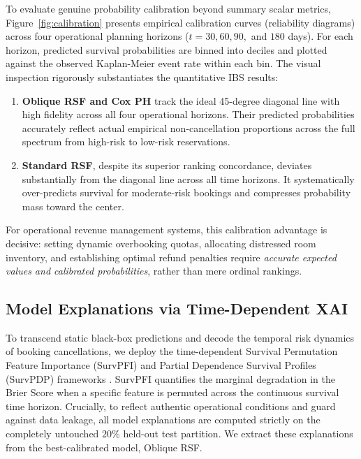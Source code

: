 \documentclass[pdflatex,iicol,sn-mathphys-ay]{sn-jnl}
\theoremstyle{thmstyleone}%
\theoremstyle{thmstyletwo}%
\theoremstyle{thmstylethree}%
\begin{document}
To evaluate genuine probability calibration beyond summary scalar metrics, Figure~\ref{fig:calibration} presents empirical calibration curves (reliability diagrams) across four operational planning horizons ($t = 30, 60, 90,$ and $180$ days). For each horizon, predicted survival probabilities are binned into deciles and plotted against the observed Kaplan-Meier event rate within each bin. The visual inspection rigorously substantiates the quantitative IBS results:
\begin{enumerate}
    \item \textbf{Oblique RSF and Cox PH} track the ideal 45-degree diagonal line with high fidelity across all four operational horizons. Their predicted probabilities accurately reflect actual empirical non-cancellation proportions across the full spectrum from high-risk to low-risk reservations.
    \item \textbf{Standard RSF}, despite its superior ranking concordance, deviates substantially from the diagonal line across all time horizons. It systematically over-predicts survival for moderate-risk bookings and compresses probability mass toward the center.
\end{enumerate}

For operational revenue management systems, this calibration advantage is decisive: setting dynamic overbooking quotas, allocating distressed room inventory, and establishing optimal refund penalties require \textit{accurate expected values and calibrated probabilities}, rather than mere ordinal rankings.

\subsection{Model Explanations via Time-Dependent XAI}
\label{sec:explanations}

To transcend static black-box predictions and decode the temporal risk dynamics of booking cancellations, we deploy the time-dependent Survival Permutation Feature Importance (SurvPFI) and Partial Dependence Survival Profiles (SurvPDP) frameworks \citep{langbein2025interpretable}. SurvPFI quantifies the marginal degradation in the Brier Score when a specific feature is permuted across the continuous survival time horizon. Crucially, to reflect authentic operational conditions and guard against data leakage, all model explanations are computed strictly on the completely untouched $20\%$ held-out test partition. We extract these explanations from the best-calibrated model, Oblique RSF.
\end{document}

